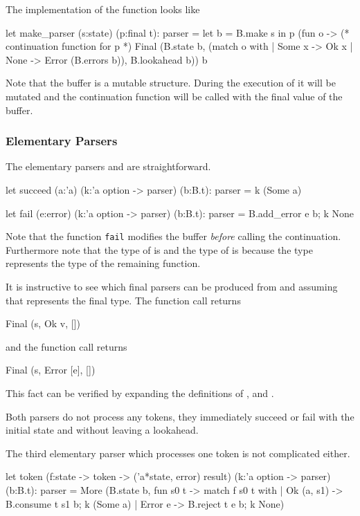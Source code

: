 The implementation of the function  looks like
\begin{ocaml}
  let make_parser (s:state) (p:final t): parser =
    let b = B.make s in
    p (fun o ->  (* continuation function for p *)
         Final (B.state b,
                (match o with
                 | Some x -> Ok x
                 | None   -> Error (B.errors b)),
                B.lookahead b))
      b
\end{ocaml}
%
Note that the buffer is a mutable structure. During the execution of 
it will be mutated and the continuation function will be called with the final
value of the buffer.


\subsubsection{Elementary Parsers}
The elementary parsers  and  are
straightforward.
\begin{ocaml}
  let succeed (a:'a) (k:'a option -> parser) (b:B.t): parser =
    k (Some a)

  let fail (e:error) (k:'a option -> parser) (b:B.t): parser =
    B.add_error e b;
    k None
\end{ocaml}
%
Note that the function \verb!fail! modifies the buffer \emph{before} calling
the continuation. Furthermore note that the type of  is  and the type of  is  because the
type  represents the type of the remaining function.

It is instructive to see which final parsers can be produced from
 and  assuming that  represents the final
type. The function call  returns
%
\begin{ocaml}
  Final (s, Ok v, [])
\end{ocaml}
%
and the function call  returns
%
\begin{ocaml}
  Final (s, Error [e], [])
\end{ocaml}
%
This fact can be verified by expanding the definitions of ,
 and .

Both parsers do not process any tokens, they immediately succeed or fail with
the initial state and without leaving a lookahead.

The third elementary parser which processes one token is not complicated
either.
\begin{ocaml}
  let token (f:state -> token -> ('a*state, error) result)
            (k:'a option -> parser)
            (b:B.t): parser =
    More (B.state b,
          fun s0 t ->
            match f s0 t with
            | Ok (a, s1) ->
                B.consume t s1 b;
                k (Some a)
            | Error e ->
                B.reject t e b;
                k None)
\end{ocaml}

